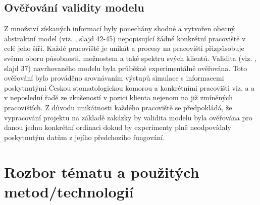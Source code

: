 \documentclass[a4paper,11pt,titlepage]{article}
\begin{document}
\subsection{Ověřování validity modelu}
Z množství získaných informací byly ponechány shodné a vytvořen obecný abstraktní model (viz. \cite{ims}, slajd 42-45) nepopisující žádné konkrétní pracoviště v celé jeho šíři. Každé pracoviště je unikát a procesy na pracovišti přizpůsobuje svému oboru působnosti, možnostem a také spektru svých klientů.
\newline
Validita (viz. \cite{ims}, slajd 37) navrhovaného modelu byla průběžně experimentálně ověřována. Toto ověřování bylo prováděno srovnávaním výstupů simulace s informacemi poskytnutými Českou stomatologickou komorou \cite{ceskastomatologickakomorarocenky} a konkrétními pracovišti viz. \cite{lukasnovak} a \cite{soldanova} a v neposlední řadě ze zkušeností v pozici klienta nejenom na již zmíněných pracovištích. Z důvodu unikátnosti každého pracoviště se předpokládá, že vypracování projektu na základě zakázky by validita modelu byla ověřována pro danou jednu konkrétní ordinaci dokud by experimenty plně neodpovídaly poskytnutým datům z jejího předchozího fungování.

\section{Rozbor tématu a použitých metod/technologií}
\end{document}
